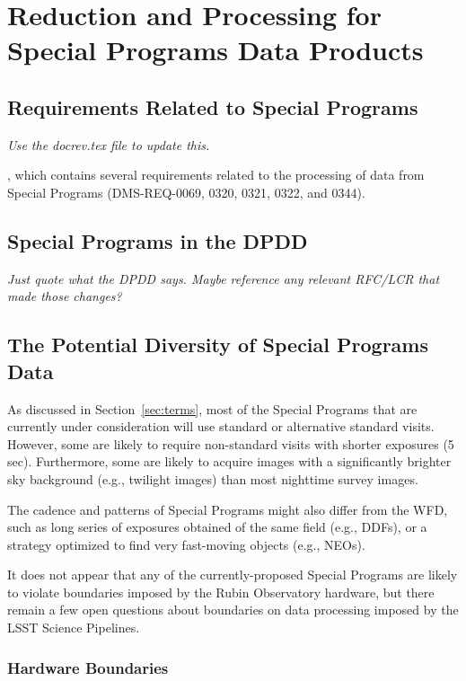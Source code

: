 \documentclass[DM,lsstdoc,toc]{lsstdoc}
\begin{document}
\clearpage
\section{Reduction and Processing for Special Programs Data Products}\label{sec:proc}


\subsection{Requirements Related to Special Programs}

{\it Use the docrev.tex file to update this.}

, which contains several requirements related to the processing of data from Special Programs (DMS-REQ-0069, 0320, 0321, 0322, and 0344). 


\subsection{Special Programs in the DPDD}

{\it Just quote what the DPDD says. Maybe reference any relevant RFC/LCR that made those changes?}



\subsection{The Potential Diversity of Special Programs Data} \label{ssec:proc_datadiv}

As discussed in Section~\ref{sec:terms}, most of the Special Programs that are currently under consideration will use standard or alternative standard visits.
However, some are likely to require non-standard visits with shorter exposures (5 sec).
Furthermore, some are likely to acquire images with a significantly brighter sky background (e.g., twilight images) than most nighttime survey images.

The cadence and patterns of Special Programs might also differ from the WFD, such as long series of exposures obtained of the same field (e.g., DDFs), or a strategy optimized to find very fast-moving objects (e.g., NEOs).

It does not appear that any of the currently-proposed Special Programs are likely to violate boundaries imposed by the Rubin Observatory hardware, but there remain a few open questions about boundaries on data processing imposed by the LSST Science Pipelines.

\subsubsection{Hardware Boundaries}
\end{document}
